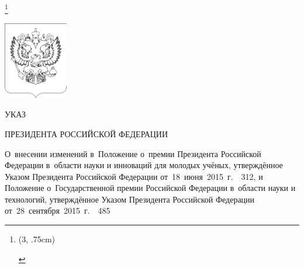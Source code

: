 \documentclass[14pt, a4paper]{extarticle}
\begin{document}
\let\thefootnote\relax\footnote{
	\centering\hspace*{-1cm}
	\begin{pspicture}(3, .75cm)
	\end{pspicture}
}

\begin{center}
	\thispagestyle{empty}

	\setBold[.3]
	
	\vspace*{-1cm}
	\includegraphics[width=2.8cm]{./emblem_black_bordered} 
	
	\huge УКАЗ \bigskip
	
	\large ПРЕЗИДЕНТА РОССИЙСКОЙ ФЕДЕРАЦИИ \bigskip\bigskip\bigskip
	
	\begin{minipage}{.9\textwidth}
		\setBold[.4]
		\centering\normalsize
		О~внесении изменений в~Положение о~премии Президента Российской Федерации в~области науки и инноваций для молодых учёных, утверждённое Указом Президента Российской Федерации от~18~июня~2015~г.~\textnumero~312, и Положение о~Государственной премии Российской Федерации в~области науки и технологий, утверждённое Указом Президента Российской Федерации от~28~сентября~2015~г.~\textnumero~485
	\end{minipage}

	\unsetBold
\end{center}

\bigskip
\end{document}
